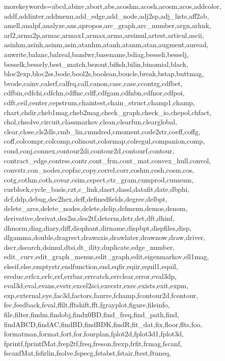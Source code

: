 %
  {morekeywords={abcd,abinv,abort,abs,acoshm,acosh,acosm,acos,addcolor,%
      addf,addinter,addmenu,add_edge,add_node,adj2sp,adj_lists,aff2ab,%
      amell,analpf,analyze,ans,apropos,arc_graph,arc_number,argn,arhnk,%
      arl2,arma2p,armac,armax1,armax,arma,arsimul,artest,articul,ascii,%
      asinhm,asinh,asinm,asin,atanhm,atanh,atanm,atan,augment,auread,%
      auwrite,balanc,balreal,bandwr,basename,bdiag,besseli,besselj,%
      besselk,bessely,best_match,bezout,bifish,bilin,binomial,black,%
      bloc2exp,bloc2ss,bode,bool2s,boolean,boucle,break,bstap,buttmag,%
      bvode,cainv,calerf,calfrq,call,canon,casc,case,ccontrg,cdfbet,%
      cdfbin,cdfchi,cdfchn,cdffnc,cdff,cdfgam,cdfnbn,cdfnor,cdfpoi,%
      cdft,ceil,center,cepstrum,chaintest,chain_struct,champ1,champ,%
      chart,chdir,cheb1mag,cheb2mag,check_graph,check_io,chepol,chfact,%
      chol,chsolve,circuit,classmarkov,clean,clearfun,clearglobal,%
      clear,close,cls2dls,cmb_lin,cmndred,cmoment,code2str,coeff,coffg,%
      coff,colcompr,colcomp,colinout,colormap,colregul,companion,comp,%
      cond,conj,connex,contour2di,contour2d,contourf,contour,%
      contract_edge,contrss,contr,cont_frm,cont_mat,convex_hull,convol,%
      convstr,con_nodes,copfac,copy,correl,corr,coshm,cosh,cosm,cos,%
      cotg,cothm,coth,covar,csim,cspect,ctr_gram,cumprod,cumsum,%
      curblock,cycle_basis,czt,c_link,dasrt,dassl,datafit,date,dbphi,%
      dcf,ddp,debug,dec2hex,deff,definedfields,degree,delbpt,%
      delete_arcs,delete_nodes,delete,delip,delmenu,demos,denom,%
      derivative,derivat,des2ss,des2tf,determ,detr,det,dft,dhinf,%
      dhnorm,diag,diary,diff,diophant,dirname,dispbpt,dispfiles,disp,%
      dlgamma,double,dragrect,drawaxis,drawlater,drawnow,draw,driver,%
      dscr,dsearch,dsimul,dtsi,dt_ility,duplicate,edge_number,%
      edit_curv,edit_graph_menus,edit_graph,edit,eigenmarkov,ell1mag,%
      elseif,else,emptystr,endfunction,end,eqfir,eqiir,equil1,equil,%
      ereduc,erfcx,erfc,erf,errbar,errcatch,errclear,error,eval3dp,%
      eval3d,eval,evans,evstr,excel2sci,execstr,exec,exists,exit,expm,%
      exp,external,eye,fac3d,factors,faurre,fchamp,fcontour2d,fcontour,%
      fec,feedback,feval,ffilt,fftshift,fft,fgrayplot,figure,fileinfo,%
      file,filter,findm,findobj,findx0BD,find_freq,find_path,find,%
      findABCD,findAC,findBD,findBDK,findR,fit_dat,fix,floor,flts,foo,%
      formatman,format,fort,for,fourplan,fplot2d,fplot3d1,fplot3d,%
      fprintf,fprintfMat,frep2tf,freq,freson,frexp,frfit,frmag,fscanf,%
      fscanfMat,fsfirlin,fsolve,fspecg,fstabst,fstair,ftest,ftuneq,%
}}
